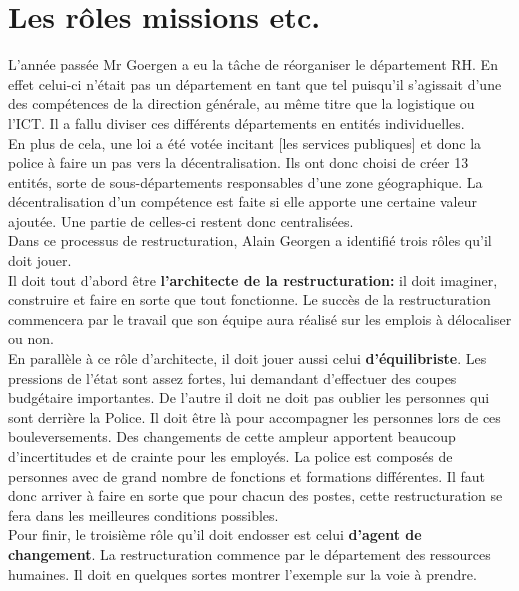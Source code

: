 \documentclass[12pt]{article}
\begin{document}
\section{Les rôles missions etc.}
L'année passée Mr Goergen a eu la tâche de réorganiser le département RH. En effet celui-ci n'était pas un département en tant que tel puisqu'il s'agissait d'une des compétences de la direction générale, au même titre que la logistique ou l'ICT. Il a fallu diviser ces différents départements en entités individuelles.\\

En plus de cela, une loi a été votée incitant [les services publiques] et donc la police à faire un pas vers la décentralisation. Ils ont donc choisi de créer 13 entités, sorte de sous-départements responsables d'une zone géographique. La décentralisation d'un compétence est faite si elle apporte une certaine valeur ajoutée. Une partie de celles-ci restent donc centralisées.\\




Dans ce processus de restructuration, Alain Georgen a identifié trois rôles qu'il doit jouer.\\
 Il doit tout d'abord être \textbf{l'architecte de la restructuration:} il doit imaginer, construire et faire en sorte que tout fonctionne. Le succès de la restructuration commencera par le travail que son équipe aura réalisé sur les emplois à délocaliser ou non. \\
 En parallèle à ce rôle d'architecte, il doit jouer aussi celui \textbf{d'équilibriste}. Les pressions de l'état sont assez fortes, lui demandant d'effectuer des coupes budgétaire importantes. De l'autre il doit ne doit pas oublier les personnes qui sont derrière la Police. Il doit être là pour accompagner les personnes lors de ces bouleversements. Des changements de cette ampleur apportent beaucoup d'incertitudes et de crainte pour les employés. La police est composés de personnes avec de grand nombre de fonctions et formations différentes. Il faut donc arriver à faire en sorte que pour chacun des postes, cette restructuration se fera dans les meilleures conditions possibles.\\
 Pour finir, le troisième rôle qu'il doit endosser est celui \textbf{d'agent de changement}. La restructuration commence par le département des ressources humaines. Il doit en quelques sortes montrer l'exemple sur la voie à prendre. 
 
\end{document}
